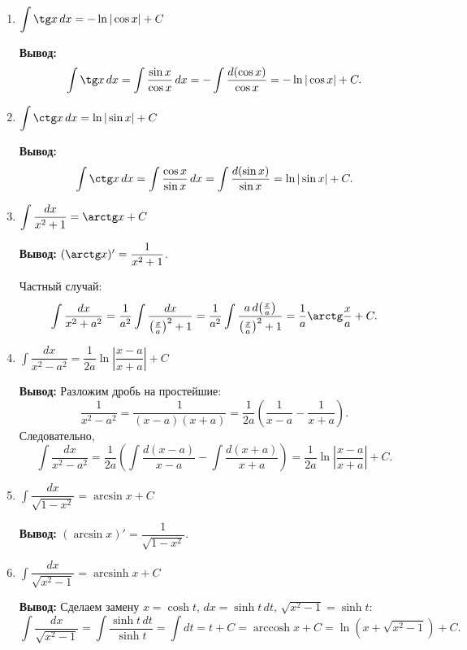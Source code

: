 \documentclass[12pt]{article}
\newcommand{\dint}{\displaystyle\int}
\begin{document}
\begin{enumerate}
        \item $\dint \tg x\,dx = -\ln|\cos x| + C$
        
        \textbf{Вывод:}
        \[
            \dint \tg x\,dx
            = \dint \frac{\sin x}{\cos x}\,dx
            = -\dint \frac{d(\cos x)}{\cos x}
            = -\ln|\cos x| + C.
        \]
        
        \item $\dint \ctg x\,dx = \ln|\sin x| + C$
        
        \textbf{Вывод:}
        \[
            \dint \ctg x\,dx
            = \dint \frac{\cos x}{\sin x}\,dx
            = \dint \frac{d(\sin x)}{\sin x}
            = \ln|\sin x| + C.
        \]
        
        \item $\dint \dfrac{dx}{x^2 + 1} = \arctg x + C$
        
        \textbf{Вывод:} $(\arctg x)' = \dfrac{1}{x^2 + 1}$. \checkmark
        
        Частный случай:
        \[
            \dint \frac{dx}{x^2 + a^2}
            = \frac{1}{a^2}\dint \frac{dx}{\left(\tfrac{x}{a}\right)^2 + 1}
            = \frac{1}{a^2}\dint \frac{a\,d\!\left(\tfrac{x}{a}\right)}{\left(\tfrac{x}{a}\right)^2 + 1}
            = \frac{1}{a}\arctg\frac{x}{a} + C.
        \]
        
        \item $\dint \dfrac{dx}{x^2 - a^2} = \dfrac{1}{2a}\ln\left|\dfrac{x-a}{x+a}\right| + C$
        
        \textbf{Вывод:} Разложим дробь на простейшие:
        \[
            \frac{1}{x^2 - a^2}
            = \frac{1}{(x-a)(x+a)}
            = \frac{1}{2a}\left(\frac{1}{x-a} - \frac{1}{x+a}\right).
        \]
        Следовательно,
        \[
            \dint \frac{dx}{x^2 - a^2}
            = \frac{1}{2a}\left(\dint\frac{d(x-a)}{x-a} - \dint\frac{d(x+a)}{x+a}\right)
            = \frac{1}{2a}\ln\left|\frac{x-a}{x+a}\right| + C.
        \]
        
        \item $\dint \dfrac{dx}{\sqrt{1 - x^2}} = \arcsin x + C$
        
        \textbf{Вывод:} $(\arcsin x)' = \dfrac{1}{\sqrt{1-x^2}}$. \checkmark
        
        \item $\dint \dfrac{dx}{\sqrt{x^2 - 1}} = \operatorname{arcsinh} x + C$
        
        \textbf{Вывод:} Сделаем замену $x = \cosh t$, $dx = \sinh t\,dt$, $\sqrt{x^2-1} = \sinh t$:
        \[
            \dint\frac{dx}{\sqrt{x^2-1}}
            = \dint\frac{\sinh t\,dt}{\sinh t}
            = \dint dt
            = t + C
            = \operatorname{arccosh} x + C
            = \ln\!\left(x + \sqrt{x^2 - 1}\right) + C.
        \]
        

\end{enumerate}
\end{document}
